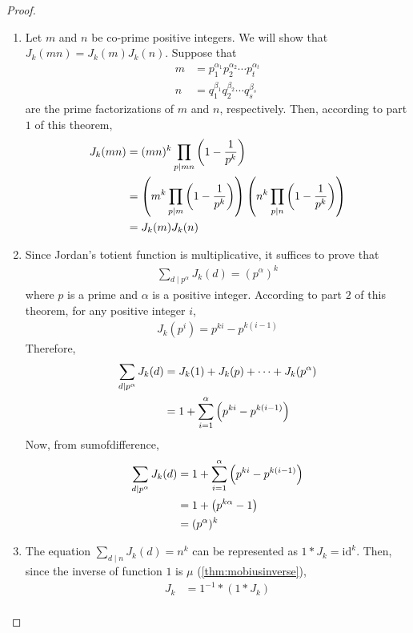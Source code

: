\begin{proof}
\begin{enumerate}
			\item Let $m$ and $n$ be co-prime positive integers. We will show that $J_k(mn)=J_k(m)J_k(n)$. Suppose that
				\begin{align*}
					m
						& = p_1^{\alpha_1}p_2^{\alpha_2} \cdots p_t^{\alpha_t}\\
					n
						& = q_1^{\beta_1}q_2^{\beta_2} \cdots q_s^{\beta_s}
				\end{align*}
			are the prime factorizations of  $m$ and $n$, respectively. Then, according to part $1$ of this theorem,
				\begin{align*}
					J_k(mn) &= (mn)^{k} \prod\limits_{p\mid mn}\left(1 - \frac{1}{p^k}\right)\\
							&= \left(m^k \prod\limits_{p\mid m}\left(1 - \frac{1}{p^k}\right)\right)\left(n^k \prod\limits_{p\mid n}\left(1 - \frac{1}{p^k}\right)\right) \\
							&= J_k(m)J_k(n)
				\end{align*}
			\item Since Jordan's totient function is multiplicative, it suffices to prove that
				\begin{align*}
					\sum\limits_{d\mid p^\alpha} J_k(d) = (p^{\alpha})^k
				\end{align*}
			where $p$ is a prime and $\alpha$ is a positive integer. According to part $2$ of this theorem, for any positive integer $i$,
				\begin{align*}
					J_k(p^i) = p^{ki} - p^{k (i -1)}
				\end{align*}
			Therefore,
				\begin{align*}
					\sum_{d\mid p^\alpha} J_k(d) &= J_k(1) + J_k(p) + \cdots + J_k(p^\alpha)\\
									 &= 1 + \sum_{i = 1}^{\alpha} \left(p^{ki} - p^{k (i -1)}\right)
				\end{align*}
			Now, from \gls{sumofdifference},
				\begin{align*}
					\sum_{d\mid p^\alpha} J_k(d) &= 1 + \sum_{i = 1}^{\alpha}\left(p^{ki} - p^{k (i -1)}\right)\\
									 &= 1 + \left(p^{k \alpha}-1\right)\\
									 &= (p^{\alpha})^k
				\end{align*}
			\item The equation $\displaystyle \sum_{d\mid n} J_k(d) = n^k$ can be represented as $1 \ast J_k = \text{id}^k$. Then, since the inverse of function $1$ is $\mu$ (\autoref{thm:mobiusinverse}),
				\begin{align*}
					J_k &= 1^{-1} \ast (1 \ast J_k)\\

\end{align*}
\end{enumerate}
\end{proof}
